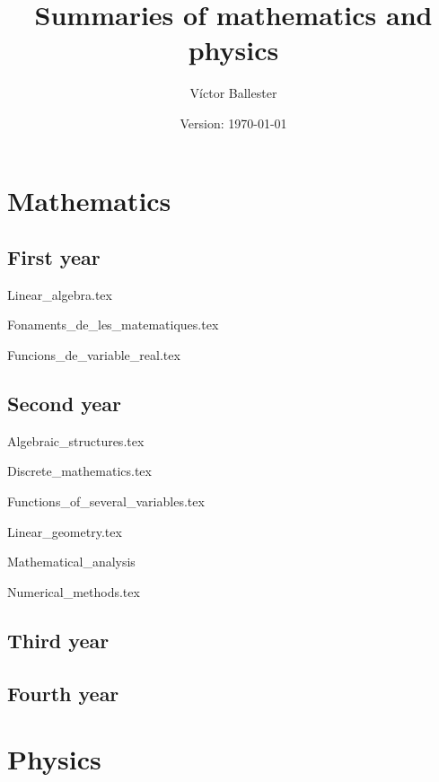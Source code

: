 \documentclass{report}
\title{Summaries of mathematics and physics}
\author{Víctor Ballester}
\date{Version: \today}
\begin{document}
\maketitle
\newpage
\tableofcontents
\newpage
\part{Mathematics}
    \chapter{First year}
        {Linear_algebra.tex}
        \cleardoublepage
        
        {Fonaments_de_les_matematiques.tex}
        \cleardoublepage
        
        {Funcions_de_variable_real.tex}
        \cleardoublepage
    \chapter{Second year}
        {Algebraic_structures.tex}
        \cleardoublepage
        
        {Discrete_mathematics.tex}
        \cleardoublepage
        
        {Functions_of_several_variables.tex}
        \cleardoublepage
        
        {Linear_geometry.tex}
        \cleardoublepage
        
        {Mathematical_analysis}
        \cleardoublepage
        
        {Numerical_methods.tex}
        \cleardoublepage
    \chapter{Third year}
    \chapter{Fourth year}
\part{Physics}
\end{document}
